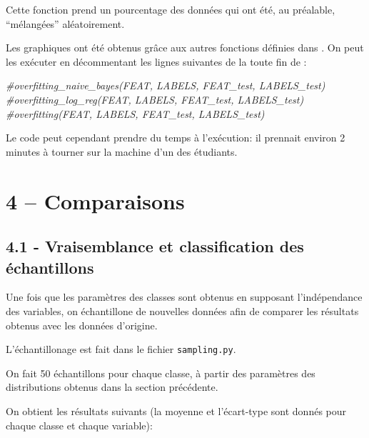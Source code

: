 \documentclass[
]{article}
\newenvironment{Shaded}{}{}
\newcommand{\CommentTok}[1]{\textcolor[rgb]{0.38,0.63,0.69}{\textit{#1}}}
\begin{document}
Cette fonction prend un pourcentage des données qui ont été, au
préalable, ``mélangées'' aléatoirement.

Les graphiques ont été obtenus grâce aux autres fonctions définies dans
. On peut les exécuter en décommentant les lignes
suivantes de la toute fin de :

\begin{Shaded}
\begin{Highlighting}[]
\CommentTok{\#overfitting\_naive\_bayes(FEAT, LABELS, FEAT\_test, LABELS\_test)}
\CommentTok{\#overfitting\_log\_reg(FEAT, LABELS, FEAT\_test, LABELS\_test)}
\CommentTok{\#overfitting(FEAT, LABELS, FEAT\_test, LABELS\_test)}
\end{Highlighting}
\end{Shaded}

Le code peut cependant prendre du temps à l'exécution: il prennait
environ 2 minutes à tourner sur la machine d'un des étudiants.

\newpage{}

\hypertarget{comparaisons}{%
\section{4 -- Comparaisons}\label{comparaisons}}

\hypertarget{vraisemblance-et-classification-des-uxe9chantillons}{%
\subsection{4.1 - Vraisemblance et classification des
échantillons}\label{vraisemblance-et-classification-des-uxe9chantillons}}

Une fois que les paramètres des classes sont obtenus en supposant
l'indépendance des variables, on échantillone de nouvelles données afin
de comparer les résultats obtenus avec les données d'origine.

L'échantillonage est fait dans le fichier \texttt{sampling.py}.

On fait 50 échantillons pour chaque classe, à partir des paramètres des
distributions obtenus dans la section précédente.

On obtient les résultats suivants (la moyenne et l'écart-type sont
donnés pour chaque classe et chaque variable):
\end{document}
